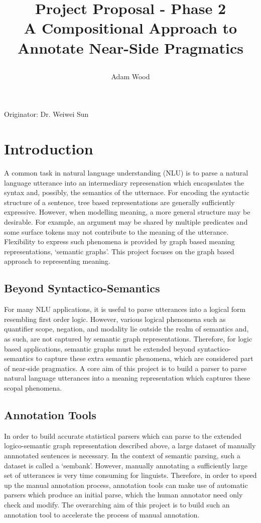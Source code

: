 \documentclass{article}
\title{
    Project Proposal - Phase 2 \\
    A Compositional Approach to Annotate Near-Side Pragmatics

    }
\author{Adam Wood}
\begin{document}
\maketitle

\large Originator: Dr. Weiwei Sun


\section{Introduction}

A common task in natural language understanding (NLU) is to parse a natural language utterance into an intermediary represenation which encapsulates the syntax and, possibly, the semantics of the utternace. For encoding the syntactic structure of a sentence, tree based representations are generally sufficiently expressive. However, when modelling meaning, a more general structure may be desirable. For example, an argument may be shared by multiple predicates and some surface tokens may not contribute to the meaning of the utterance. Flexibility to express such phenomena is provided by graph based meaning representations, `semantic graphs'. This project focuses on the graph based approach to representing meaning.

\subsection{Beyond Syntactico-Semantics}

For many NLU applications, it is useful to parse utterances into a logical form resembling first order logic. However, various logical phenomena such as quantifier scope, negation, and modality lie outside the realm of semantics and, as such, are not captured by semantic graph representations. Therefore, for logic based applications, semantic graphs must be extended beyond syntactico-semantics to capture these extra semantic phenomena, which are considered part of near-side pragmatics. A core aim of this project is to build a parser to parse natural language utterances into a meaning representation which captures these scopal phenomena.

\subsection{Annotation Tools}

In order to build accurate statistical parsers which can parse to the extended logico-semantic graph representation described above, a large dataset of manually annnotated sentences is necessary. In the context of semantic parsing, such a dataset is called a `sembank'. However, manually annotating a sufficiently large set of utterances is very time consuming for linguists. Therefore, in order to speed up the manual annotation process, annotation tools can make use of automatic parsers which produce an initial parse, which the human annotator need only check and modify. The overarching aim of this project is to build such an annotation tool to accelerate the process of manual annotation.
\end{document}
